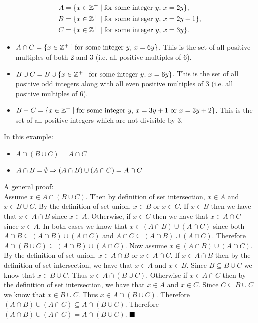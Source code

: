 \documentclass[12pt]{book}
\begin{document}
\begin{enumerate}
\begin{align*}
A &= \set{x \in \mathbb{Z^+} \mid \text{for some integer } y,\, x = 2y},\\
B &= \set{x \in \mathbb{Z^+} \mid \text{for some integer } y,\, x = 2y + 1},\\
C &= \set{x \in \mathbb{Z^+} \mid \text{for some integer } y,\, x = 3y}.
\end{align*}
	\begin{enumerate}
	{\begin{itemize}
		\item $A \cap C = \set{x \in \mathbb{Z^+} \mid \text{for some integer } y,\, x = 6y}$. This is the set of all positive multiples of both 2 and 3 (i.e. all positive multiples of 6).
		\item $B \cup C = B \cup \set{x \in \mathbb{Z^+} \mid \text{for some integer } y,\, x = 6y}$. This is the set of all positive odd integers along with all even positive multiples of 3 (i.e. all positive multiples of 6).
		\item $B - C = \set{x \in \mathbb{Z^+} \mid \text{for some integer } y,\, x = 3y + 1 \text{ or } x = 3y + 2}$. This is the set of all positive integers which are not divisible by 3.
	 \end{itemize}}
	{In this example:
	\begin{itemize}
		\item $A \cap (B \cup C) = A \cap C$
		\item $A \cap B = \emptyset \then (A \cap B) \cup (A \cap C) = A \cap C$
	\end{itemize}
	A general proof:\\
	Assume $x \in A \cap (B \cup C)$. Then by definition of set intersection, $x \in A$ and $x \in B \cup C$. By the definition of set union, $x \in B$ or $x \in C$. If $x \in B$ then we have that $x \in A \cap B$ since $x \in A$. Otherwise, if $x \in C$ then we have that $x \in A \cap C$ since $x \in A$. In both cases we know that $x \in (A \cap B) \cup (A \cap C)$ since both $A \cap B \subseteq (A \cap B) \cup (A \cap C)$ and $A \cap C \subseteq (A \cap B) \cup (A \cap C)$. Therefore $A \cap (B \cup C) \subseteq (A \cap B) \cup (A \cap C)$. Now assume $x \in (A \cap B) \cup (A \cap C)$. By the definition of set union, $x \in A \cap B$ or $x \in A \cap C$. If $x \in A \cap B$ then by the definition of set intersection, we have that $x \in A$ and $x \in B$. Since $B \subseteq B \cup C$ we know that $x \in B \cup C$. Thus $x \in A \cap (B \cup C)$. Otherwise if $x \in A \cap C$ then by the definition of set intersection, we have that $x \in A$ and $x \in C$. Since $C \subseteq B \cup C$ we know that $x \in B \cup C$. Thus $x \in A \cap (B \cup C)$. Therefore $(A \cap B) \cup (A \cap C) \subseteq  A \cap (B \cup C)$. Therefore $(A \cap B) \cup (A \cap C) =  A \cap (B \cup C)$. $\qed$}

\end{enumerate}
\end{enumerate}
\end{document}
